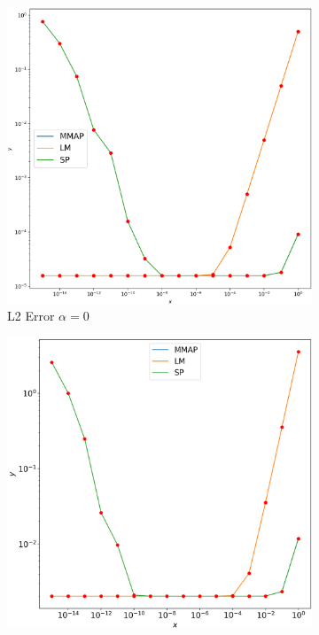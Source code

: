 \documentclass[12pt]{ociamthesis}
\begin{document}
\begin{figure}[H]
 \begin{subfigure}{0.44\textwidth}
     \includegraphics[width=\textwidth]{Pics/LHSims/E1a_MMAP_LM_SPL2.png}
     \caption{L2 Error $\alpha=0$}
 \end{subfigure}
   \begin{subfigure}{0.44\textwidth}
     \includegraphics[width=\textwidth]{Pics/LHSims/E1a_MMAP_LM_SPH1.png}

\end{subfigure}
\end{figure}
\end{document}
